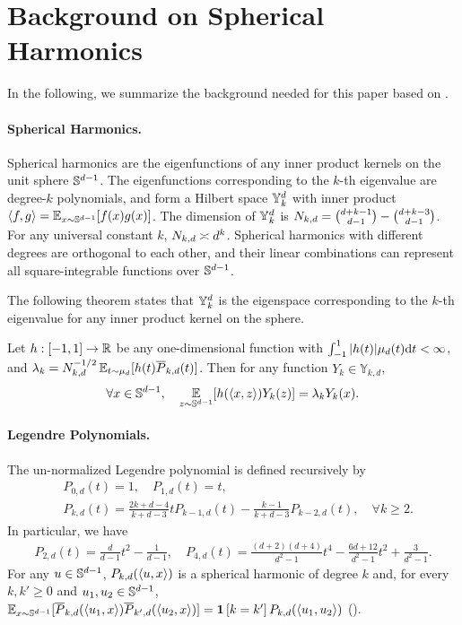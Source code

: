 \section{Background on Spherical Harmonics}\label{app:SH}
In the following, we summarize the background needed for this paper based on \citet[Section 2]{atkinson2012spherical}.

\paragraph{Spherical Harmonics.} 
Spherical harmonics are the eigenfunctions of any inner product kernels on the unit sphere $\mathbb{S}^{d-1}$. The eigenfunctions corresponding to the $k$-th eigenvalue are degree-$k$ polynomials, and form a Hilbert space $\mathbb{Y}_{k}^{d}$ with  inner product $\langle f, g \rangle = \operatorname*{\mathbb{E}}_{x \sim \mathbb{S}^{d - 1}} [f(x) g(x)]$. The dimension of $\mathbb{Y}_{k}^{d}$ is ${N_{k, d}}=\binom{d+k-1}{d-1} - \binom{d+k-3}{d-1}$. For any universal constant $k$, ${N_{k, d}} \asymp d^k$. Spherical harmonics with different degrees are orthogonal to each other, and their linear combinations can represent all square-integrable functions over $\mathbb{S}^{d-1}$.

The following theorem states that $\mathbb{Y}_{k}^{d}$ is the eigenspace corresponding to the $k$-th eigenvalue for any inner product kernel on the sphere.
\begin{theorem}\label{thm:funk-hecke}
	Let $h:[-1,1]\to\mathbb{R}$ be any one-dimensional function with $\int_{-1}^{1}|h(t)|\mu_d(t)\mathrm{d} t<\infty$, and $\lambda_k=N_{k,d}^{-1/2}\operatorname*{\mathbb{E}}_{t\sim \mu_d}[h(t)\overline{P}_{k,d}(t)]$. Then for any function $Y_k\in \mathbb{Y}_{k,d}$,
	\begin{align}
		\forall x\in\mathbb{S}^{d-1}, \quad \operatorname*{\mathbb{E}}_{z\sim \mathbb{S}^{d-1}}[h(\left<x, z\right>)Y_k(z)]=\lambda_k Y_k(x).
	\end{align}
\end{theorem}

\paragraph{Legendre Polynomials.}
The un-normalized Legendre polynomial is defined recursively by
\begin{align}
    &P_{0,d}(t)=1,\quad P_{1,d}(t)=t, \label{eq:legn_inductive1} \\
    &P_{k,d}(t)=\frac{2k+d-4}{k+d-3}tP_{k-1,d}(t)-\frac{k-1}{k+d-3}P_{k-2,d}(t),\quad \forall k\ge 2. \label{eq:legn_inductive2}
\end{align}
In particular, we have
\begin{align} \label{eq:legendre_polynomial_2_4}
    P_{2, d}(t) = \frac{d}{d - 1}t^2 - \frac{1}{d - 1},\quad 
    P_{4, d}(t) = \frac{(d + 2)(d + 4)}{d^2 - 1}t^4 - \frac{6d + 12}{d^2 - 1}t^2 + \frac{3}{d^2 - 1}.
\end{align}
For any $u \in \mathbb{S}^{d - 1}$, ${P_{k, d}}(\left<u, x\right>)$ is a spherical harmonic of degree $k$ and, for every $k,k'\ge 0$ and $u_1, u_2 \in \mathbb{S}^{d - 1}$, $\operatorname*{\mathbb{E}}_{x \sim \mathbb{S}^{d - 1}} [\overline{P}_{k, d}(\left<u_1, x\right>) \overline{P}_{k',d}(\left<u_2, x\right>)] = \mathbf{1}\left[ k=k' \right]{P_{k, d}}(\left<u_1, u_2\right>)$ ().


